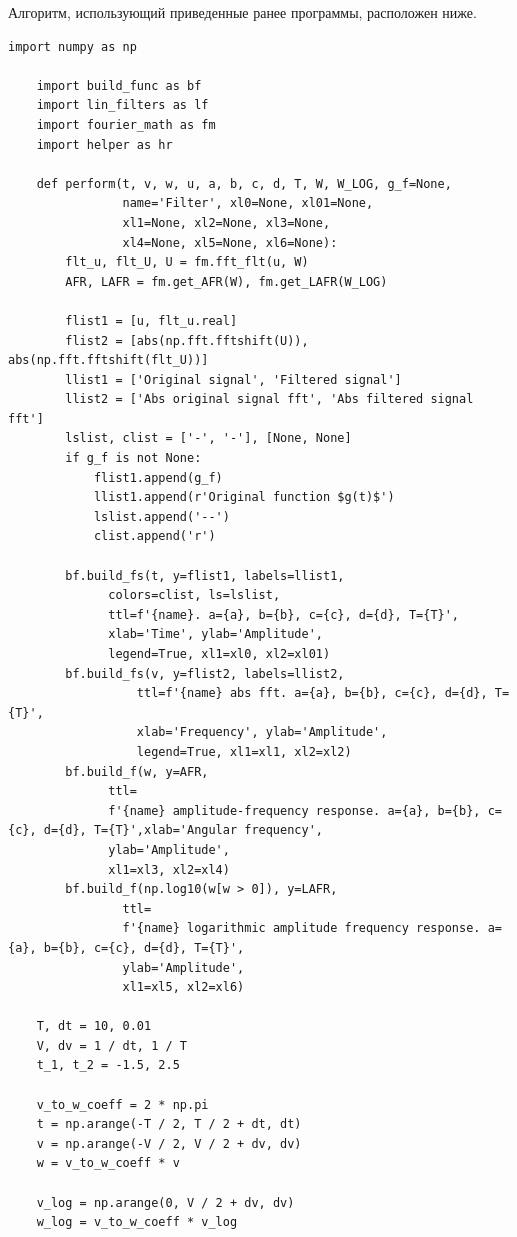\documentclass[a4paper, 12pt]{article}
\begin{document}
    Алгоритм, использующий приведенные ранее программы, расположен ниже.
    \begin{lstlisting}[label=l2, caption={Алгоритм, использующий приведенные ранее программы.}]
    import numpy as np

    import build_func as bf
    import lin_filters as lf
    import fourier_math as fm
    import helper as hr

    def perform(t, v, w, u, a, b, c, d, T, W, W_LOG, g_f=None,
                name='Filter', xl0=None, xl01=None,
                xl1=None, xl2=None, xl3=None,
                xl4=None, xl5=None, xl6=None):
        flt_u, flt_U, U = fm.fft_flt(u, W)
        AFR, LAFR = fm.get_AFR(W), fm.get_LAFR(W_LOG)

        flist1 = [u, flt_u.real]
        flist2 = [abs(np.fft.fftshift(U)), abs(np.fft.fftshift(flt_U))]
        llist1 = ['Original signal', 'Filtered signal']
        llist2 = ['Abs original signal fft', 'Abs filtered signal fft']
        lslist, clist = ['-', '-'], [None, None]
        if g_f is not None:
            flist1.append(g_f)
            llist1.append(r'Original function $g(t)$')
            lslist.append('--')
            clist.append('r')

        bf.build_fs(t, y=flist1, labels=llist1,
              colors=clist, ls=lslist,
              ttl=f'{name}. a={a}, b={b}, c={c}, d={d}, T={T}', 
              xlab='Time', ylab='Amplitude',
              legend=True, xl1=xl0, xl2=xl01)
        bf.build_fs(v, y=flist2, labels=llist2, 
                  ttl=f'{name} abs fft. a={a}, b={b}, c={c}, d={d}, T={T}', 
                  xlab='Frequency', ylab='Amplitude',
                  legend=True, xl1=xl1, xl2=xl2)
        bf.build_f(w, y=AFR,
              ttl=
              f'{name} amplitude-frequency response. a={a}, b={b}, c={c}, d={d}, T={T}',xlab='Angular frequency', 
              ylab='Amplitude',
              xl1=xl3, xl2=xl4)
        bf.build_f(np.log10(w[w > 0]), y=LAFR,
                ttl=
                f'{name} logarithmic amplitude frequency response. a={a}, b={b}, c={c}, d={d}, T={T}',
                ylab='Amplitude',
                xl1=xl5, xl2=xl6)

    T, dt = 10, 0.01
    V, dv = 1 / dt, 1 / T
    t_1, t_2 = -1.5, 2.5

    v_to_w_coeff = 2 * np.pi
    t = np.arange(-T / 2, T / 2 + dt, dt)
    v = np.arange(-V / 2, V / 2 + dv, dv)
    w = v_to_w_coeff * v

    v_log = np.arange(0, V / 2 + dv, dv)
    w_log = v_to_w_coeff * v_log


\end{lstlisting}
\end{document}
